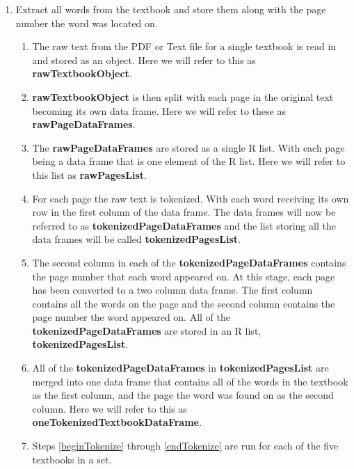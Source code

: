 \documentclass[12]{article}
\begin{document}
\begin{enumerate}


\item Extract all words from the textbook and store them along with the page number the word was located on.
	
	\begin{enumerate}
	\item The raw text from the PDF or Text file for a single textbook is read in and stored as an object. Here we will refer to this as \textbf{rawTextbookObject}. \label{beginTokenize}
	
	\item \textbf{rawTextbookObject} is then split with each page in the original text becoming its own data frame. Here we will refer to these as \textbf{rawPageDataFrames}.

	\item The \textbf{rawPageDataFrames} are stored as a single R list. With each page being a data frame that is one element of the R list. Here we will refer to this list as \textbf{rawPagesList}.

	\item For each page the raw text is tokenized. With each word receiving its own row in the first column of the data frame. The data frames will now be referred to as \textbf{tokenizedPageDataFrames} and the list storing all the data frames will be called \textbf{tokenizedPagesList}. 
	
	\item The second column in each of the \textbf{tokenizedPageDataFrames} contains the page number that each word appeared on. At this stage, each page has been converted to a two column data frame. The first column contains all the words on the page and the second column contains the page number the word appeared on. All of the \textbf{tokenizedPageDataFrames} are stored in an R list, \textbf{tokenizedPagesList}.

	\item All of the \textbf{tokenizedPageDataFrames} in \textbf{tokenizedPagesList} are merged into one data frame that contains all of the words in the textbook as the first column, and the page the word was found on as the second column. Here we will refer to this as \textbf{oneTokenizedTextbookDataFrame}.\label{endTokenize}
	
	\item Steps \ref{beginTokenize} through \ref{endTokenize} are run for each of the five textbooks in a set.
	\end{enumerate}


\end{enumerate}
\end{document}

